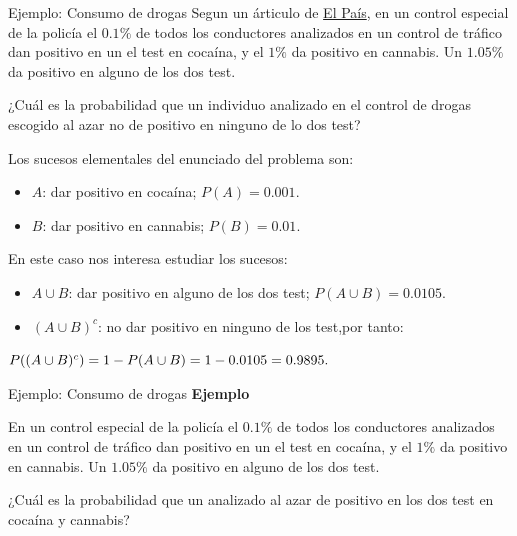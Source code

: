 \documentclass[
  ignorenonframetext,
  aspectratio=169]{beamer}
\providecommand{\tightlist}{%
  \setlength{\itemsep}{0pt}\setlength{\parskip}{0pt}}\usepackage{longtable,booktabs,array}
\begin{document}
\begin{frame}{Ejemplo: Consumo de drogas}
\label{ejemplo-consumo-de-drogas}
Segun un árticulo de
\href{https://elpais.com/politica/2019/01/02/actualidad/1546426491_623324.html}{El
País}, en un control especial de la policía el \(0.1\%\) de todos los
conductores analizados en un control de tráfico dan positivo en un el
test en cocaína, y el \(1\%\) da positivo en cannabis. Un \(1.05\%\) da
positivo en alguno de los dos test.

¿Cuál es la probabilidad que un individuo analizado en el control de
drogas escogido al azar no de positivo en ninguno de lo dos test?

Los sucesos elementales del enunciado del problema son:

\begin{itemize}
\tightlist
\item
  \(A\): dar positivo en cocaína; \(P(A)=0.001.\)
\item
  \(B\): dar positivo en cannabis; \(P(B)=0.01.\)
\end{itemize}

En este caso nos interesa estudiar los sucesos:

\begin{itemize}
\tightlist
\item
  \(A\cup B\): dar positivo en alguno de los dos test;
  \(P(A\cup B)=0.0105.\)
\item
  \((A\cup B)^c\): no dar positivo en ninguno de los test,por tanto:
\end{itemize}

\(\hfill P((A\cup B)^c)=1-P(A\cup B)=1-0.0105=0.9895.\hfill\)
\end{frame}

\begin{frame}{Ejemplo: Consumo de drogas}
\label{ejemplo-consumo-de-drogas-1}
\textbf{Ejemplo}

En un control especial de la policía el \(0.1\%\) de todos los
conductores analizados en un control de tráfico dan positivo en un el
test en cocaína, y el \(1\%\) da positivo en cannabis. Un \(1.05\%\) da
positivo en alguno de los dos test.

¿Cuál es la probabilidad que un analizado al azar de positivo en los dos
test en cocaína y cannabis?
\end{frame}
\end{document}
